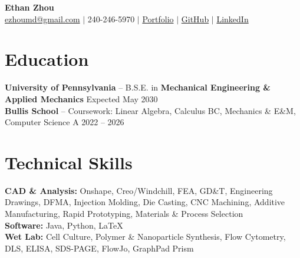 \documentclass[10pt, letterpaper]{article}
\begin{document}
\begin{center}
    {\sffamily\LARGE\bfseries Ethan Zhou}
    \vspace{2pt} \\
    \href{mailto:ezhoumd@gmail.com}{ezhoumd@gmail.com}
    $|$
    240-246-5970
    $|$
    \href{https://ezhoumd.github.io/personal-portfolio/}{Portfolio}
    $|$
    \href{https://github.com/ezhoumd}{GitHub}
    $|$
    \href{https://www.linkedin.com/in/ezhoumd/}{LinkedIn}
\end{center}

\section{Education}
    \textbf{University of Pennsylvania} -- B.S.E. in \textbf{Mechanical Engineering \& Applied Mechanics}
    \hfill Expected May 2030 \\
    \textbf{Bullis School} -- Coursework: Linear Algebra, Calculus BC, Mechanics \& E\&M, Computer Science A
    \hfill 2022 -- 2026

\section{Technical Skills}
    \textbf{CAD \& Analysis:} Onshape, Creo/Windchill, FEA, GD\&T, Engineering Drawings, DFMA, Injection Molding, Die Casting, CNC Machining, Additive Manufacturing, Rapid Prototyping, Materials \& Process Selection \\
    \textbf{Software:} Java, Python, LaTeX \\
    \textbf{Wet Lab:} Cell Culture, Polymer \& Nanoparticle Synthesis, Flow Cytometry, DLS, ELISA, SDS-PAGE, FlowJo, GraphPad Prism
\end{document}

